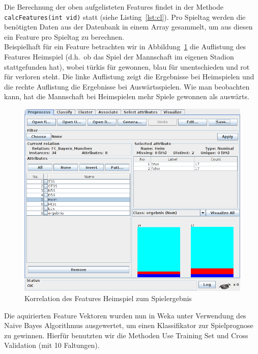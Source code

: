 \documentclass[
10pt,
a4paper
]{scrartcl}
\begin{document}
Die Berechnung der oben aufgelisteten Features findet in der Methode \texttt{calcFeatures(int vid)} statt (siehe Listing~\ref{lst:cl}). Pro Spieltag werden die benötigten Daten aus der Datenbank in einem Array gesammelt, um aus diesen ein Feature pro Spieltag zu berechnen.\\



Beispielhaft für ein Feature betrachten wir in Abbildung~\ref{fig:heim} die Auflistung des Features Heimspiel (d.h.~ob das Spiel der Mannschaft im eigenen Stadion stattgefunden hat), wobei türkis für gewonnen, blau für unentschieden und rot für verloren steht. Die linke Auflistung zeigt die Ergebnisse bei Heimspielen und die rechte Auflistung die Ergebnisse bei Auswärtsspielen. Wie man beobachten kann, hat die Mannschaft bei Heimspielen mehr Spiele gewonnen als auswärts.

\begin{figure}[H]
\centering
  \includegraphics[scale=0.4]{fcb_heim.png}
\caption{Korrelation des Features Heimspiel zum Spielergebnis}
\label{fig:heim}
\end{figure}

Die aquirierten Feature Vektoren wurden nun in Weka unter Verwendung des Naive Bayes Algorithmus ausgewertet, um einen Klassifikator zur Spielprognose zu gewinnen. Hierfür benutzten wir die Methoden Use Training Set und Cross Validation (mit 10 Faltungen).\\
\end{document}
